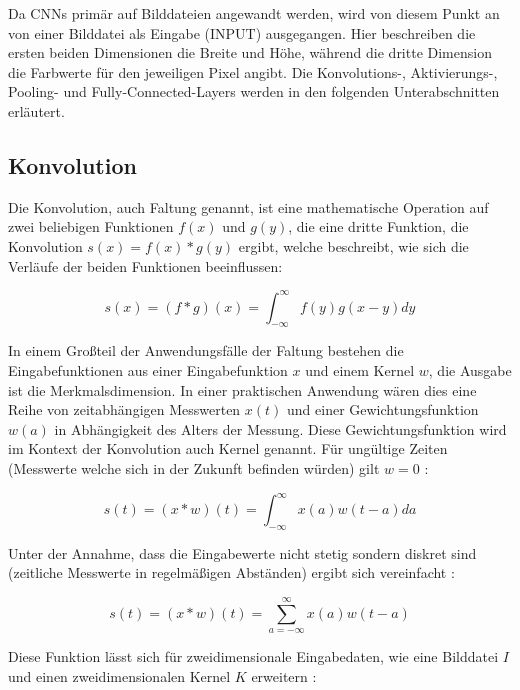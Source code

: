 Da CNNs primär auf Bilddateien angewandt werden, wird von diesem Punkt an von einer Bilddatei als Eingabe ($\mathrm{INPUT}$) ausgegangen. Hier beschreiben die ersten beiden Dimensionen die Breite und Höhe, während die dritte Dimension die Farbwerte für den jeweiligen Pixel angibt. Die Konvolutions-, Aktivierungs-, Pooling- und Fully-Connected-Layers werden in den folgenden Unterabschnitten erläutert.

\subsection{Konvolution}
\label{ssec:conv}

Die Konvolution, auch Faltung genannt, ist eine mathematische Operation auf zwei beliebigen Funktionen $f(x)$ und $g(y)$, die eine dritte Funktion, die Konvolution $s(x) = f(x)*g(y)$ ergibt, welche beschreibt, wie sich die Verläufe der beiden Funktionen beeinflussen:

\begin{equation}
s(x) = (f*g)(x) = \int_{-\infty}^{\infty} f(y)g(x-y)dy
\end{equation}

In einem Großteil der Anwendungsfälle der Faltung bestehen die Eingabefunktionen aus einer Eingabefunktion $x$ und einem Kernel $w$, die Ausgabe ist die Merkmalsdimension. In einer praktischen Anwendung wären dies \bspw eine Reihe von zeitabhängigen Messwerten $x(t)$ und einer Gewichtungsfunktion $w(a)$ in Abhängigkeit des Alters der Messung. Diese Gewichtungsfunktion wird im Kontext der Konvolution auch Kernel genannt. Für ungültige Zeiten (\bspw Messwerte welche sich in der Zukunft befinden würden) gilt $w=0$ \cite[Kap.~9]{deeplearning_16}:

\begin{equation}
s(t) = (x*w)(t) = \int_{-\infty}^{\infty} x(a)w(t-a)da
\end{equation}

Unter der Annahme, dass die Eingabewerte nicht stetig sondern diskret sind (\bspw zeitliche Messwerte in regelmäßigen Abständen) ergibt sich vereinfacht \cite[Kap.~9]{deeplearning_16}:

\begin{equation}
s(t) = (x*w)(t) = \sum_{a=-\infty}^{\infty}x(a)w(t-a)
\end{equation}

Diese Funktion lässt sich für zweidimensionale Eingabedaten, wie \zB eine Bilddatei $I$ und einen zweidimensionalen Kernel $K$ erweitern \cite[Kap.~9]{deeplearning_16}:

